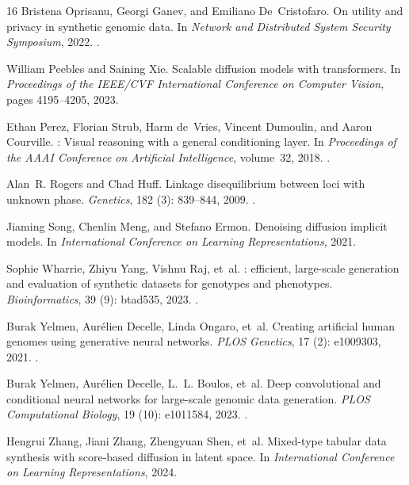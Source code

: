 \documentclass[11pt,a4paper]{article}
\begin{document}
\begin{thebibliography}{16}
Bristena Oprisanu, Georgi Ganev, and Emiliano De~Cristofaro.
\newblock On utility and privacy in synthetic genomic data.
\newblock In \emph{Network and Distributed System Security Symposium}, 2022.
\newblock {}.

William Peebles and Saining Xie.
\newblock Scalable diffusion models with transformers.
\newblock In \emph{Proceedings of the IEEE/CVF International Conference on
  Computer Vision}, pages 4195--4205, 2023.

Ethan Perez, Florian Strub, Harm de~Vries, Vincent Dumoulin, and Aaron
  Courville.
: Visual reasoning with a general conditioning layer.
\newblock In \emph{Proceedings of the AAAI Conference on Artificial
  Intelligence}, volume~32, 2018.
\newblock {}.

Alan~R. Rogers and Chad Huff.
\newblock Linkage disequilibrium between loci with unknown phase.
\newblock \emph{Genetics}, 182 (3): 839--844, 2009.
\newblock {}.

Jiaming Song, Chenlin Meng, and Stefano Ermon.
\newblock Denoising diffusion implicit models.
\newblock In \emph{International Conference on Learning Representations}, 2021.

Sophie Wharrie, Zhiyu Yang, Vishnu Raj, et~al.
: efficient, large-scale generation and evaluation of
  synthetic datasets for genotypes and phenotypes.
\newblock \emph{Bioinformatics}, 39 (9): btad535, 2023.
\newblock {}.

Burak Yelmen, Aur{\'e}lien Decelle, Linda Ongaro, et~al.
\newblock Creating artificial human genomes using generative neural networks.
\newblock \emph{PLOS Genetics}, 17 (2): e1009303, 2021.
\newblock {}.

Burak Yelmen, Aur{\'e}lien Decelle, L.~L. Boulos, et~al.
\newblock Deep convolutional and conditional neural networks for large-scale
  genomic data generation.
\newblock \emph{PLOS Computational Biology}, 19 (10):
  e1011584, 2023.
\newblock {}.

Hengrui Zhang, Jiani Zhang, Zhengyuan Shen, et~al.
\newblock Mixed-type tabular data synthesis with score-based diffusion in
  latent space.
\newblock In \emph{International Conference on Learning Representations}, 2024.

\end{thebibliography}

\endgroup
\end{document}
